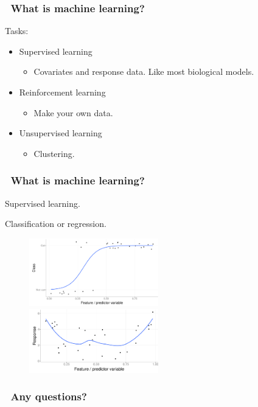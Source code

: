 \documentclass[handout, aspectratio = 169]{beamer}
\begin{document}
\begin{frame}
\frametitle{\insertframenumber~What is machine learning?}
Tasks:
\begin{itemize}
\item Supervised learning
\begin{itemize}
\item Covariates and response data. Like most biological models.
\end{itemize}
\item Reinforcement learning
\begin{itemize}
\item Make your own data.
\end{itemize}
\item Unsupervised learning
\begin{itemize}
\item Clustering.
\end{itemize}
\end{itemize}
\end{frame} 



\begin{frame}
\frametitle{\insertframenumber~What is machine learning?}
Supervised learning.

Classification or regression.
\begin{figure}
    \includegraphics[width = 0.5\textwidth]{classification}%
    \includegraphics[width = 0.5\textwidth]{regression}
\end{figure} 

\end{frame} 





\begin{frame}
\frametitle{\insertframenumber~Any questions?}


\end{frame} 
\end{document}
